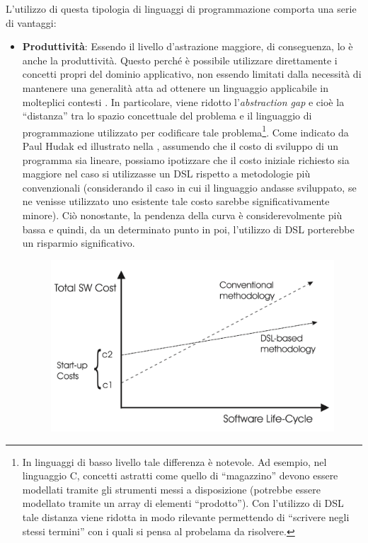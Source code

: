 \documentclass[12pt,a4paper,openright,twoside]{book}
\begin{document}
L’utilizzo di questa tipologia di linguaggi di programmazione comporta una serie di vantaggi:
\begin{itemize}
    \item \textbf{Produttività}: Essendo il livello d’astrazione maggiore, di conseguenza, lo è anche la produttività. Questo perché è 
    possibile utilizzare direttamente i concetti propri del dominio applicativo, non essendo limitati dalla necessità di mantenere una 
    generalità atta ad ottenere un linguaggio applicabile in molteplici contesti  \cite{Kelly2008}. In particolare, viene ridotto 
    l'\textit{abstraction gap} e cioè la ``distanza'' tra lo spazio concettuale del problema e il linguaggio di programmazione utilizzato per 
    codificare tale problema\footnote{In linguaggi di basso livello tale differenza è notevole. Ad esempio, nel linguaggio C, 
    concetti astratti come quello di ``magazzino'' devono essere modellati tramite gli strumenti messi a disposizione (potrebbe essere modellato
    tramite un array di elementi ``prodotto''). Con l'utilizzo di DSL tale distanza viene ridotta in modo rilevante permettendo di ``scrivere 
    negli stessi termini'' con i quali si pensa al probelama da risolvere.}. Come indicato da Paul Hudak 
    \cite{Hudak1997} ed illustrato nella , assumendo che il costo di sviluppo di un programma sia lineare, possiamo 
    ipotizzare che il costo iniziale richiesto sia maggiore nel caso si utilizzasse un \ac{DSL} rispetto a metodologie più convenzionali 
    (considerando il caso in cui il linguaggio andasse sviluppato, se ne venisse utilizzato uno esistente tale costo sarebbe significativamente 
    minore). Ciò nonostante, la pendenza della curva è considerevolmente più bassa e quindi, da un determinato punto in poi, l’utilizzo di 
    \ac{DSL} porterebbe un risparmio significativo.
    \begin{figure}
        \centering
        \includegraphics[width=.8\linewidth]{figures/sw-dev-cost.pdf}

\end{figure}
\end{itemize}
\end{document}
